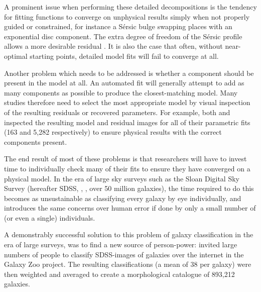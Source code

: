 \documentclass[../main.tex]{subfiles}
\begin{document}
A prominent issue when performing these detailed decompositions is the tendency for fitting functions to converge on unphysical results simply when not properly guided or constrained, for instance a S\'ersic bulge swapping places with an exponential disc component. The extra degree of freedom of the S\'ersic profile allows a more desirable residual \citep{2017MNRAS.469.3363K}. It is also the case that often, without near-optimal starting points, detailed model fits will fail to converge at all.

Another problem which needs to be addressed is whether a component should be present in the model at all. An automated fit will generally attempt to add as many components as possible to produce the closest-matching model. Many studies therefore need to select the most appropriate model by visual inspection of the resulting residuals or recovered parameters. For example, both \citet{Vika2014:1408.4070v1} and \citet{2018MNRAS.473.4731K} inspected the resulting model and residual images for all of their parametric fits (163 and 5,282 respectively) to ensure physical results with the correct components present.

The end result of most of these problems is that researchers will have to invest time to individually check many of their fits to ensure they have converged on a physical model. In the era of large sky surveys such as the Sloan Digital Sky Survey (hereafter SDSS, \citealt{2017AJ....154...28B}, \citealt{SDSSDR7}, over 50 million galaxies), the time required to do this becomes as unsustainable as classifying every galaxy by eye individually, and introduces the same concerns over human error if done by only a small number of (or even a single) individuals.


A demonstrably successful solution to this problem of galaxy classification in the era of large surveys, was to find a new source of person-power: \cite{Lintott2008:0804.4483v1} invited large numbers of people to classify SDSS-images of galaxies over the internet in the Galaxy Zoo project. The resulting classifications (a mean of 38 per galaxy) were then weighted and averaged to create a morphological catalogue of 893,212 galaxies.
\end{document}
